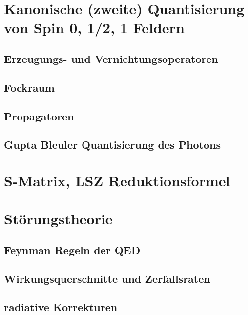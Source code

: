 \documentclass{include/thesisclass}
\begin{document}
\chapter{Kanonische (zweite) Quantisierung von Spin 0, 1/2, 1 Feldern}
\section{Erzeugungs- und Vernichtungsoperatoren}
\section{Fockraum}
\section{Propagatoren}
\section{Gupta Bleuler Quantisierung des Photons}

\chapter{S-Matrix, LSZ Reduktionsformel}

\chapter{Störungstheorie}	
\section{Feynman Regeln der QED}
\section{Wirkungsquerschnitte und Zerfallsraten}
\section{radiative Korrekturen}
\end{document}
